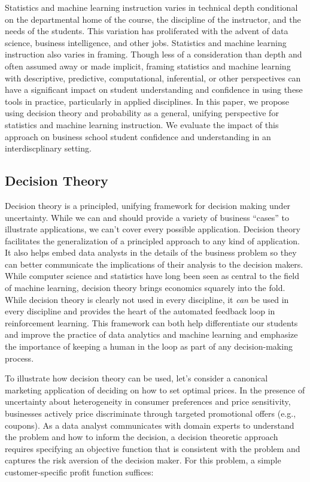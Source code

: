 \documentclass[
  12pt]{article}
\begin{document}
Statistics and machine learning instruction varies in technical depth
conditional on the departmental home of the course, the discipline of
the instructor, and the needs of the students. This variation has
proliferated with the advent of data science, business intelligence, and
other jobs. Statistics and machine learning instruction also varies in
framing. Though less of a consideration than depth and often assumed
away or made implicit, framing statistics and machine learning with
descriptive, predictive, computational, inferential, or other
perspectives can have a significant impact on student understanding and
confidence in using these tools in practice, particularly in applied
disciplines. In this paper, we propose using decision theory and
probability as a general, unifying perspective for statistics and
machine learning instruction. We evaluate the impact of this approach on
business school student confidence and understanding in an
interdiscplinary setting.

\subsection{Decision Theory}\label{decision-theory}

Decision theory is a principled, unifying framework for decision making
under uncertainty. While we can and should provide a variety of business
``cases'' to illustrate applications, we can't cover every possible
application. Decision theory facilitates the generalization of a
principled approach to any kind of application. It also helps embed data
analysts in the details of the business problem so they can better
communicate the implications of their analysis to the decision makers.
While computer science and statistics have long been seen as central to
the field of machine learning, decision theory brings economics squarely
into the fold. While decision theory is clearly not used in every
discipline, it \emph{can} be used in every discipline and provides the
heart of the automated feedback loop in reinforcement learning. This
framework can both help differentiate our students and improve the
practice of data analytics and machine learning and emphasize the
importance of keeping a human in the loop as part of any decision-making
process.

To illustrate how decision theory can be used, let's consider a
canonical marketing application of deciding on how to set optimal
prices. In the presence of uncertainty about heterogeneity in consumer
preferences and price sensitivity, businesses actively price
discriminate through targeted promotional offers (e.g., coupons). As a
data analyst communicates with domain experts to understand the problem
and how to inform the decision, a decision theoretic approach requires
specifying an objective function that is consistent with the problem and
captures the risk aversion of the decision maker. For this problem, a
simple customer-specific profit function suffices:
\end{document}
